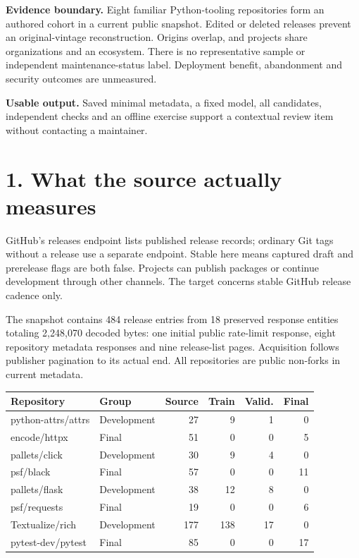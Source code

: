 \documentclass[11pt]{article}
\newcommand{\MSourceRows}{484}
\newcommand{\MSourceFiles}{18}
\newcommand{\MSourceBytes}{2,248,070}
\newcommand{\MRepoASource}{27}
\newcommand{\MRepoATraining}{9}
\newcommand{\MRepoAValidation}{1}
\newcommand{\MRepoAFinal}{0}
\newcommand{\MRepoBSource}{51}
\newcommand{\MRepoBTraining}{0}
\newcommand{\MRepoBValidation}{0}
\newcommand{\MRepoBFinal}{5}
\newcommand{\MRepoCSource}{30}
\newcommand{\MRepoCTraining}{9}
\newcommand{\MRepoCValidation}{4}
\newcommand{\MRepoCFinal}{0}
\newcommand{\MRepoDSource}{57}
\newcommand{\MRepoDTraining}{0}
\newcommand{\MRepoDValidation}{0}
\newcommand{\MRepoDFinal}{11}
\newcommand{\MRepoESource}{38}
\newcommand{\MRepoETraining}{12}
\newcommand{\MRepoEValidation}{8}
\newcommand{\MRepoEFinal}{0}
\newcommand{\MRepoFSource}{19}
\newcommand{\MRepoFTraining}{0}
\newcommand{\MRepoFValidation}{0}
\newcommand{\MRepoFFinal}{6}
\newcommand{\MRepoGSource}{177}
\newcommand{\MRepoGTraining}{138}
\newcommand{\MRepoGValidation}{17}
\newcommand{\MRepoGFinal}{0}
\newcommand{\MRepoHSource}{85}
\newcommand{\MRepoHTraining}{0}
\newcommand{\MRepoHValidation}{0}
\newcommand{\MRepoHFinal}{17}
\begin{document}
\textbf{Evidence boundary.} Eight familiar Python-tooling repositories form an authored cohort in a current public snapshot. Edited or deleted releases prevent an original-vintage reconstruction. Origins overlap, and projects share organizations and an ecosystem. There is no representative sample or independent maintenance-status label. Deployment benefit, abandonment and security outcomes are unmeasured.

\textbf{Usable output.} Saved minimal metadata, a fixed model, all candidates, independent checks and an offline exercise support a contextual review item without contacting a maintainer.
\newpage
\section*{1. What the source actually measures}
GitHub's releases endpoint lists published release records; ordinary Git tags without a release use a separate endpoint. Stable here means captured draft and prerelease flags are both false. Projects can publish packages or continue development through other channels. The target concerns stable GitHub release cadence only.

The snapshot contains \MSourceRows{} release entries from \MSourceFiles{} preserved response entities totaling \MSourceBytes{} decoded bytes: one initial public rate-limit response, eight repository metadata responses and nine release-list pages. Acquisition follows publisher pagination to its actual end. All repositories are public non-forks in current metadata.

\begin{center}\small\begin{tabular}{llrrrr}\toprule
Repository & Group & Source & Train & Valid. & Final\\\midrule
python-attrs/attrs & Development & \MRepoASource & \MRepoATraining & \MRepoAValidation & \MRepoAFinal \\
encode/httpx & Final & \MRepoBSource & \MRepoBTraining & \MRepoBValidation & \MRepoBFinal \\
pallets/click & Development & \MRepoCSource & \MRepoCTraining & \MRepoCValidation & \MRepoCFinal \\
psf/black & Final & \MRepoDSource & \MRepoDTraining & \MRepoDValidation & \MRepoDFinal \\
pallets/flask & Development & \MRepoESource & \MRepoETraining & \MRepoEValidation & \MRepoEFinal \\
psf/requests & Final & \MRepoFSource & \MRepoFTraining & \MRepoFValidation & \MRepoFFinal \\
Textualize/rich & Development & \MRepoGSource & \MRepoGTraining & \MRepoGValidation & \MRepoGFinal \\
pytest-dev/pytest & Final & \MRepoHSource & \MRepoHTraining & \MRepoHValidation & \MRepoHFinal \\
\bottomrule\end{tabular}\end{center}
\end{document}
